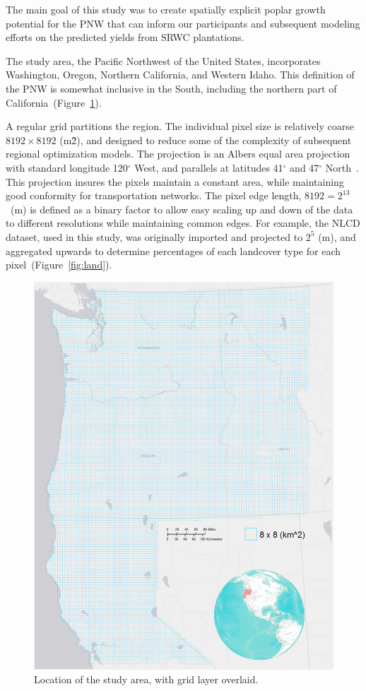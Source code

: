 \documentclass[preprint,12pt]{elsarticle}
\newcommand{\degree}{\ensuremath{{}^{\circ}}\xspace}
\begin{document}
The main goal of this study was to create spatially explicit poplar
growth potential for the \ac{PNW} that can inform our participants and
subsequent modeling efforts on the predicted yields from \ac{SRWC}
plantations.

The study area, the Pacific Northwest of the United States,
incorporates Washington, Oregon, Northern California, and Western
Idaho.  This definition of the \acs{PNW} is somewhat inclusive in the
South, including the northern part of California~(Figure~\ref{fig:grid}).

A regular grid partitions the region.  The individual pixel size is
relatively coarse $8192 \times 8192$ (m\^2), and designed to reduce
some of the complexity of subsequent regional optimization models.
The projection is an Albers equal area projection with standard
longitude 120\degree West, and parallels at latitudes 41\degree and
47\degree North~\cite{Butler}. This projection insures the pixels
maintain a constant area, while maintaining good conformity for
transportation networks.  The pixel edge length, $8192 = 2^{13}$~(m)
is defined as a binary factor to allow easy scaling up and down of the
data to different resolutions while maintaining common edges.  For
example, the \ac{NLCD} dataset, used in this study, was originally
imported and projected to $2^5$ (m), and aggregated upwards to
determine percentages of each landcover type for each
pixel~(Figure~\ref{fig:land}).

\begin{figure}[hp]
  \centering
  \includegraphics[width=1.0\linewidth]{grid}
  \caption{Location of the study area, with grid layer overlaid.}
  \label{fig:grid}
\end{figure}
\end{document}
